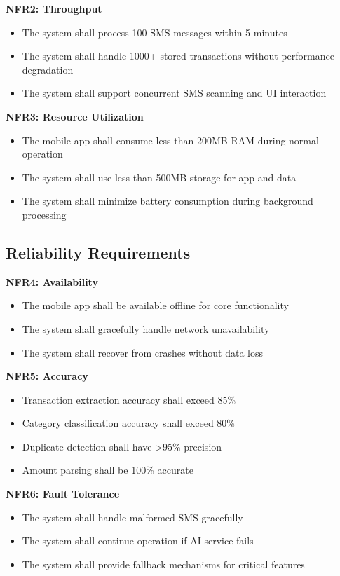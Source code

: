 \documentclass[11pt,a4paper]{report}
\begin{document}
\textbf{NFR2: Throughput}
\begin{itemize}
    \item The system shall process 100 SMS messages within 5 minutes
    \item The system shall handle 1000+ stored transactions without performance degradation
    \item The system shall support concurrent SMS scanning and UI interaction
\end{itemize}

\textbf{NFR3: Resource Utilization}
\begin{itemize}
    \item The mobile app shall consume less than 200MB RAM during normal operation
    \item The system shall use less than 500MB storage for app and data
    \item The system shall minimize battery consumption during background processing
\end{itemize}

\subsection{Reliability Requirements}

\textbf{NFR4: Availability}
\begin{itemize}
    \item The mobile app shall be available offline for core functionality
    \item The system shall gracefully handle network unavailability
    \item The system shall recover from crashes without data loss
\end{itemize}

\textbf{NFR5: Accuracy}
\begin{itemize}
    \item Transaction extraction accuracy shall exceed 85\%
    \item Category classification accuracy shall exceed 80\%
    \item Duplicate detection shall have >95\% precision
    \item Amount parsing shall be 100\% accurate
\end{itemize}

\textbf{NFR6: Fault Tolerance}
\begin{itemize}
    \item The system shall handle malformed SMS gracefully
    \item The system shall continue operation if AI service fails
    \item The system shall provide fallback mechanisms for critical features
\end{itemize}
\end{document}
